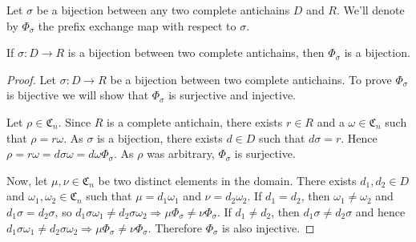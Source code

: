 \documentclass[12pt]{amsart}
\newcommand{\Cn}{\mathfrak{C}_n}
\begin{document}
        \begin{comment}
        
        We will now define a map $\Phi$ which will allow us to define $V$. Let $D$ and $R$ be two complete antichains of the same order and consider a bijection $\sigma$ between them. We define $\Phi$ to be the prefix exchange map with respect to $\sigma$.
        
        \end{comment}
        
        Let $\sigma$ be a bijection between any two complete antichains $D$ and $R$. We'll denote by $\Phi_\sigma$ the prefix exchange map with respect to $\sigma$. 
        
        \begin{lemma}\label{phi-bijection}
        
            If $\sigma: D \to R$ is a bijection between two complete antichains, then $\Phi_\sigma$ is a bijection.
        \end{lemma}
        
        \begin{proof}
        
            
            Let $\sigma:D\to R$ be a bijection between two complete antichains. To prove $\Phi_\sigma$ is bijective we will show that $\Phi_\sigma$ is surjective and injective.
            
            Let $\rho \in \Cn$. Since $R$ is a complete antichain, there exists $r \in R$ and a $\omega \in \Cn$ such that $\rho = r \omega$. As $\sigma$ is a bijection, there exists $d \in D$ such that $d \sigma = r$. Hence $\rho = r \omega = d \sigma \omega = d \omega \Phi_\sigma$. As $\rho$ was arbitrary, $\Phi_\sigma$ is surjective.
            
            Now, let $\mu,\nu \in \Cn$ be two distinct elements in the domain. There exists $d_1,d_2 \in D$ and $\omega_1,\omega_2 \in \Cn$ such that $\mu = d_1 \omega_1$ and $\nu = d_2 \omega_2$. If $d_1 = d_2$, then $\omega_1 \neq \omega_2$ and $d_1 \sigma = d_2 \sigma$, so $d_1 \sigma \omega_1 \neq d_2 \sigma \omega_2 \Rightarrow \mu \Phi_\sigma \neq \nu \Phi_\sigma$. If $d_1 \neq d_2$, then $d_1 \sigma \neq d_2 \sigma$ and hence $d_1 \sigma \omega_1 \neq d_2 \sigma \omega_2 \Rightarrow \mu \Phi_\sigma \neq \nu \Phi_\sigma$. Therefore $\Phi_\sigma$ is also injective. 
            
                
        \end{proof}
        
\end{document}

